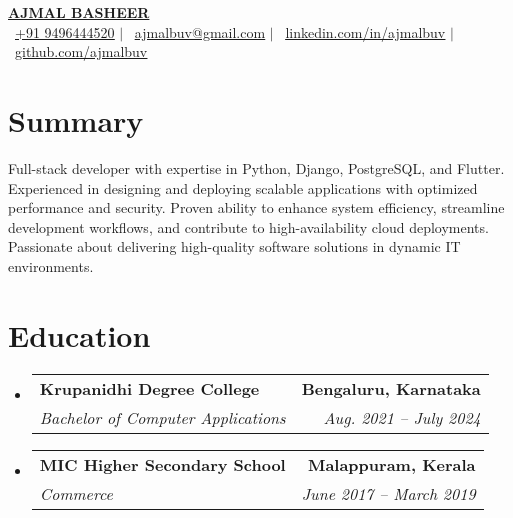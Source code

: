 \documentclass[a4paper,11pt]{article}
\makeatletter
\newcommand{\resumeSubheading}[4]{
	\vspace{-2pt}\item
		\begin{tabular*}{0.97\textwidth}[t]{l@{\extracolsep{\fill}}r}
			\textbf{#1} & \textbf{\small #2} \\
			\textit{\small#3} & \textit{\small #4} \\
		\end{tabular*}\vspace{-7pt}
}
\newcommand{\resumeSubHeadingListStart}{\begin{itemize}[leftmargin=0.15in, label={}]}
\newcommand{\resumeSubHeadingListEnd}{\end{itemize}}
\makeatother
\begin{document}
\begin{center}
	{\selectfont \textbf{\Huge \scshape \href{https://ajmalbuv.github.io}{AJMAL BASHEER}}} \\ \vspace{1pt}
	\small{
		\raisebox{-0.1\height}\faPhone\ \href{tel:+919496444520}{\underline{+91 9496444520}} $|$
		\raisebox{-0.2\height}\faEnvelope\ \href{mailto:ajmalbuv@gmail.com}{\underline{ajmalbuv@gmail.com}} $|$
		\raisebox{-0.2\height}\faLinkedin\ \href{https://linkedin.com/in/ajmalbuv}{\underline{linkedin.com/in/ajmalbuv}} $|$
		\raisebox{-0.2\height}\faGithub\ \href{https://github.com/ajmalbuv}{\underline{github.com/ajmalbuv}}
	}
\end{center}

\section{Summary}
\begin{itemize}[leftmargin=0.15in, label={}]
	\small{\item{
				Full-stack developer with expertise in Python, Django, PostgreSQL, and Flutter. Experienced in designing and deploying scalable applications with optimized performance and security. Proven ability to enhance system efficiency, streamline development workflows, and contribute to high-availability cloud deployments. Passionate about delivering high-quality software solutions in dynamic IT environments.
				}}
\end{itemize}
\section{Education}
\resumeSubHeadingListStart
\resumeSubheading
{Krupanidhi Degree College}{Bengaluru, Karnataka}
{Bachelor of Computer Applications}{Aug. 2021 -- July 2024}
\resumeSubheading
{MIC Higher Secondary School}{Malappuram, Kerala}
{Commerce}{June 2017 -- March 2019}
\resumeSubHeadingListEnd

\end{document}
